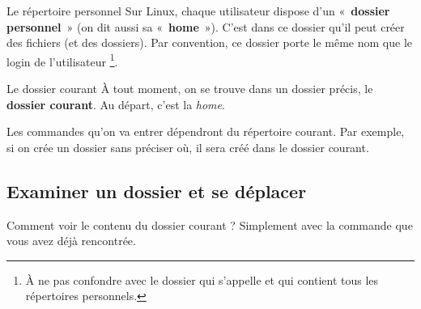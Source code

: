 \documentclass[a4paper,11pt]{style-esi/td}
\begin{document}
		\begin{theorie}{Le répertoire personnel}
			Sur Linux, chaque utilisateur dispose d'un « \textbf{dossier personnel} » 
			(on dit aussi sa « \textbf{home} »). 
			C'est dans ce dossier qu'il peut créer des fichiers (et des dossiers). 
			Par convention, ce dossier porte le même nom que le login de l'utilisateur%
			\footnote{%
				À ne pas confondre avec le dossier qui s'appelle 
				et qui contient tous les répertoires personnels.
			}.
		\end{theorie}

		\begin{theorie}{Le dossier courant}
			À tout moment,
			on se trouve dans un dossier précis, le \og{}\textbf{dossier courant}\fg{}. 
			Au départ, c’est la \emph{home}.
		\end{theorie}

		Les commandes qu'on va entrer dépendront du répertoire courant.
		Par exemple, si on crée un dossier sans préciser où,
		il sera créé dans le dossier courant.

	\subsection{Examiner un dossier et se déplacer}

		Comment voir le contenu du dossier courant ? 
		Simplement avec la commande  que vous avez déjà rencontrée.
				
\end{document}
